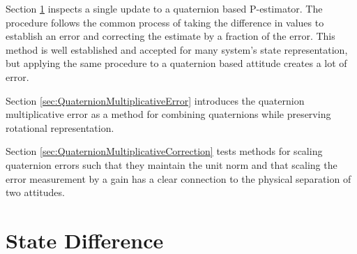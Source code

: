 Section \ref{sec:StateDifference} inspects a single update to a quaternion based P-estimator.  The procedure follows the common process of taking the difference in values to establish an error and correcting the estimate by a fraction of the error.  This method is well established and accepted for many system's state representation, but applying the same procedure to a quaternion based attitude creates a lot of error.

Section \ref{sec:QuaternionMultiplicativeError} introduces the quaternion multiplicative error as a method for combining quaternions while preserving rotational representation.

Section \ref{sec:QuaternionMultiplicativeCorrection} tests methods for scaling quaternion errors such that they maintain the unit norm and that scaling the error measurement by a gain has a clear connection to the physical separation of two attitudes.

\section{State Difference}
\label{sec:StateDifference}

